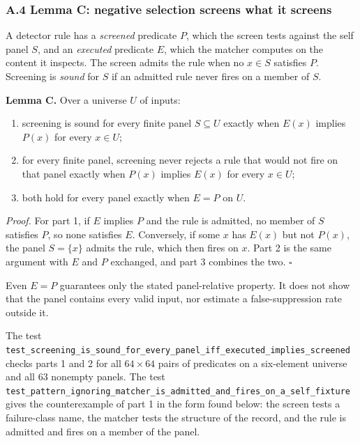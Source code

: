 \documentclass[
  11pt,
]{article}
\providecommand{\tightlist}{%
  \setlength{\itemsep}{0pt}\setlength{\parskip}{0pt}}
\begin{document}
\hypertarget{a.4-lemma-c-negative-selection-screens-what-it-screens}{%
\subsubsection{A.4 Lemma C: negative selection screens what it
screens}\label{a.4-lemma-c-negative-selection-screens-what-it-screens}}

A detector rule has a \emph{screened} predicate \(P\), which the screen
tests against the self panel \(S\), and an \emph{executed} predicate
\(E\), which the matcher computes on the content it inspects. The screen
admits the rule when no \(x \in S\) satisfies \(P\). Screening is
\emph{sound} for \(S\) if an admitted rule never fires on a member of
\(S\).

\textbf{Lemma C.} Over a universe \(U\) of inputs:

\begin{enumerate}
\def\labelenumi{\arabic{enumi}.}
\tightlist
\item
  screening is sound for every finite panel \(S \subseteq U\) exactly
  when \(E(x)\) implies \(P(x)\) for every \(x \in U\);
\item
  for every finite panel, screening never rejects a rule that would not
  fire on that panel exactly when \(P(x)\) implies \(E(x)\) for every
  \(x \in U\);
\item
  both hold for every panel exactly when \(E = P\) on \(U\).
\end{enumerate}

\emph{Proof.} For part 1, if \(E\) implies \(P\) and the rule is
admitted, no member of \(S\) satisfies \(P\), so none satisfies \(E\).
Conversely, if some \(x\) has \(E(x)\) but not \(P(x)\), the panel
\(S = \{x\}\) admits the rule, which then fires on \(x\). Part 2 is the
same argument with \(E\) and \(P\) exchanged, and part 3 combines the
two. \(\square\)

Even \(E=P\) guarantees only the stated panel-relative property. It does
not show that the panel contains every valid input, nor estimate a
false-suppression rate outside it.

The test
\texttt{\nolinkurl{test_screening_is_sound_for_every_panel_iff_executed_implies_screened}}
checks parts 1 and 2 for all \(64 \times 64\) pairs of predicates on a
six-element universe and all 63 nonempty panels. The test
\texttt{\nolinkurl{test_pattern_ignoring_matcher_is_admitted_and_fires_on_a_self_fixture}}
gives the counterexample of part 1 in the form found below: the screen
tests a failure-class name, the matcher tests the structure of the
record, and the rule is admitted and fires on a member of the panel.
\end{document}
